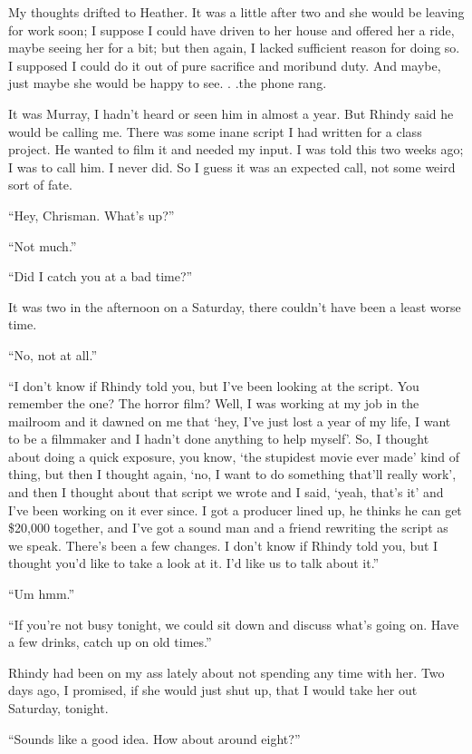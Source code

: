 My thoughts drifted to Heather. It was a little after two and she would
be leaving for work soon; I suppose I could have driven to her house and
offered her a ride, maybe seeing her for a bit; but then again, I lacked
sufficient reason for doing so. I supposed I could do it out of pure
sacrifice and moribund duty. And maybe, just maybe she would be happy to
see. . .the phone rang.

It was Murray, I hadn't heard or seen him in almost a year. But Rhindy
said he would be calling me. There was some inane script I had written
for a class project. He wanted to film it and needed my input. I was
told this two weeks ago; I was to call him. I never did. So I guess it
was an expected call, not some weird sort of fate.

``Hey, Chrisman. What's up?''

``Not much.''

``Did I catch you at a bad time?''

It was two in the afternoon on a Saturday, there couldn't have been a
least worse time.

``No, not at all.''

``I don't know if Rhindy told you, but I've been looking at the script.
You remember the one? The horror film? Well, I was working at my job in
the mailroom and it dawned on me that `hey, I've just lost a year of my
life, I want to be a filmmaker and I hadn't done anything to help
myself'. So, I thought about doing a quick exposure, you know, `the
stupidest movie ever made' kind of thing, but then I thought again, `no,
I want to do something that'll really work', and then I thought about
that script we wrote and I said, `yeah, that's it' and I've been working
on it ever since. I got a producer lined up, he thinks he can get
\$20,000 together, and I've got a sound man and a friend rewriting the
script as we speak. There's been a few changes. I don't know if Rhindy
told you, but I thought you'd like to take a look at it. I'd like us to
talk about it.''

``Um hmm.''

``If you're not busy tonight, we could sit down and discuss what's going
on. Have a few drinks, catch up on old times.''

Rhindy had been on my ass lately about not spending any time with her.
Two days ago, I promised, if she would just shut up, that I would take
her out Saturday, tonight.

``Sounds like a good idea. How about around eight?''

